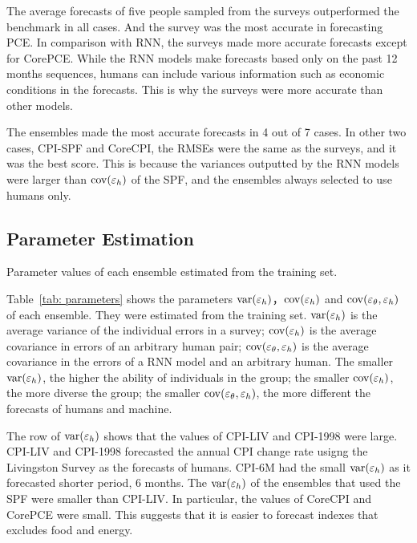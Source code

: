 \documentclass[../main.tex]{subfiles}
\begin{document}
The average forecasts of five people sampled from the surveys outperformed the benchmark in all cases.
And the survey was the most accurate in forecasting PCE\@.
In comparison with RNN, the surveys made more accurate forecasts except for CorePCE\@.
While the RNN models make forecasts based only on the past 12 months sequences, humans can include various information such as economic conditions in the forecasts.
This is why the surveys were more accurate than other models.

The ensembles made the most accurate forecasts in 4 out of 7 cases.
In other two cases, CPI-SPF and CoreCPI, the RMSEs were the same as the surveys, and it was the best score.
This is because the variances outputted by the RNN models were larger than $\operatorname{cov}(\varepsilon_h)$ of the SPF, and the ensembles always selected to use humans only.

\subsection{Parameter Estimation}
\label{sub: Parameter Estimation}

\begin{table}
  \caption{
    Parameter values of each ensemble estimated from the training set.
  }\label{tab: parameters}
  \begin{center}
    \small
    
  \end{center}
\end{table}

Table~\ref{tab: parameters} shows the parameters $\operatorname{var}(\varepsilon_h)$，$\operatorname{cov}(\varepsilon_h)$ and $\operatorname{cov}(\varepsilon_\theta, \varepsilon_h)$ of each ensemble.
They were estimated from the training set.
$\operatorname{var}(\varepsilon_h)$ is the average variance of the individual errors in a survey; $\operatorname{cov}(\varepsilon_h)$ is the average covariance in errors of an arbitrary human pair; $\operatorname{cov}(\varepsilon_\theta, \varepsilon_h)$ is the average covariance in the errors of a RNN model and an arbitrary human.
The smaller $\operatorname{var}(\varepsilon_h)$, the higher the ability of individuals in the group; the smaller $\operatorname{cov}(\varepsilon_h)$, the more diverse the group; the smaller $\operatorname{cov}(\varepsilon_\theta, \varepsilon_h)$, the more different the forecasts of humans and machine.

The row of $\operatorname{var}(\varepsilon_h)$ shows that the values of CPI-LIV and CPI-1998 were large.
CPI-LIV and CPI-1998 forecasted the annual CPI change rate usigng the Livingston Survey as the forecasts of humans.
CPI-6M had the small $\operatorname{var}(\varepsilon_h)$ as it forecasted shorter period, 6 months.
The $\operatorname{var}(\varepsilon_h)$ of the ensembles that used the SPF were smaller than CPI-LIV\@.
In particular, the values of CoreCPI and CorePCE were small.
This suggests that it is easier to forecast indexes that excludes food and energy.
\end{document}
